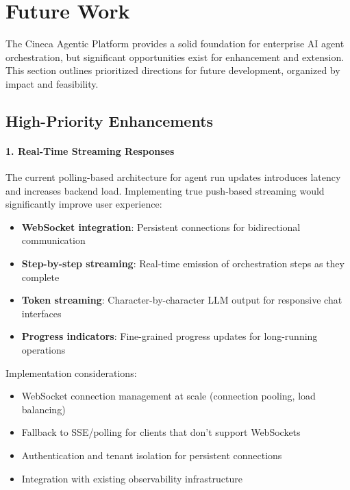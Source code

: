 
\section{Future Work}
\label{sec:future-work}

The Cineca Agentic Platform provides a solid foundation for enterprise AI agent orchestration, but significant opportunities exist for enhancement and extension. This section outlines prioritized directions for future development, organized by impact and feasibility.

\subsection{High-Priority Enhancements}

\paragraph{1. Real-Time Streaming Responses}

The current polling-based architecture for agent run updates introduces latency and increases backend load. Implementing true push-based streaming would significantly improve user experience:

\begin{itemize}
    \item \textbf{WebSocket integration}: Persistent connections for bidirectional communication
    \item \textbf{Step-by-step streaming}: Real-time emission of orchestration steps as they complete
    \item \textbf{Token streaming}: Character-by-character LLM output for responsive chat interfaces
    \item \textbf{Progress indicators}: Fine-grained progress updates for long-running operations
\end{itemize}

Implementation considerations:
\begin{itemize}
    \item WebSocket connection management at scale (connection pooling, load balancing)
    \item Fallback to SSE/polling for clients that don't support WebSockets
    \item Authentication and tenant isolation for persistent connections
    \item Integration with existing observability infrastructure
\end{itemize}

